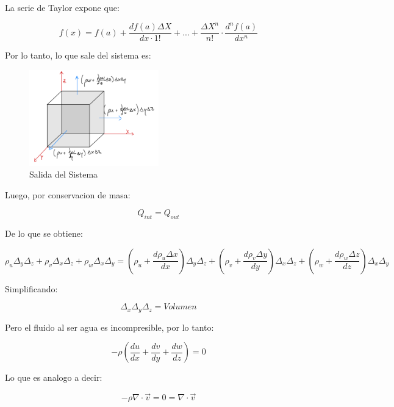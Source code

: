 La serie de Taylor expone que:

\begin{equation}
    f(x) = f(a) + \frac{df(a) \Delta X}{dx \cdot 1!} + ... + \frac{\Delta X^n}{n!} \cdot \frac{d^n f(a)}{dx^n}
\end{equation}

Por lo tanto, lo que sale del sistema es:

\begin{figure}[H]
    \centering
    \includegraphics[width=0.5\textwidth]{FOTOS/out.jpg}
    \caption{Salida del Sistema}
    \label{fig:ley_darcy}
\end{figure}

Luego, por conservacion de masa:

\begin{equation}
    Q_{int} = Q_{out}
\end{equation}

De lo que se obtiene:

\begin{equation}
    \rho_u \Delta_y \Delta_z + \rho_v \Delta_x \Delta_z + \rho_w \Delta_x \Delta_y = (\rho_u + \frac{d\rho_u \Delta x}{dx})\Delta_y \Delta_z + (\rho_v + \frac{d\rho_v \Delta y}{dy})\Delta_x \Delta_z + (\rho_w + \frac{d\rho_w \Delta z}{dz})\Delta_x \Delta_y
\end{equation}

Simplificando:

\begin{equation}
    \Delta_x \Delta_y \Delta_z = Volumen
\end{equation}

Pero el fluido al ser agua es incompresible, por lo tanto:

\begin{equation}
   -\rho(\frac{du}{dx}+ \frac{dv}{dy}+ \frac{dw}{dz}) = 0
\end{equation}

Lo que es analogo a decir:

\begin{equation}
    -\rho \nabla \cdot \vec{v} = 0 = \nabla \cdot \vec{v}
\end{equation}

